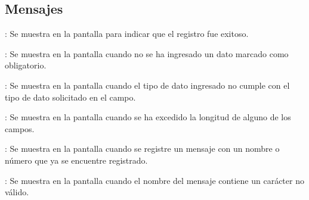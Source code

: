 \subsection{Mensajes}

\begin{Citemize}
	\item {}: Se muestra en la pantalla  para indicar que el registro fue exitoso.
	\item {}: Se muestra en la pantalla  cuando no se ha ingresado un dato marcado como obligatorio.
	\item {}: Se muestra en la pantalla  cuando el tipo de dato ingresado no cumple con el tipo de dato solicitado en el campo.
	\item {}: Se muestra en la pantalla  cuando se ha excedido la longitud de alguno de los campos.
	\item {}: Se muestra en la pantalla  cuando se registre un mensaje con un nombre o número que ya se encuentre registrado.
	\item {}: Se muestra en la pantalla  cuando el nombre del mensaje contiene un carácter no válido.
\end{Citemize}
